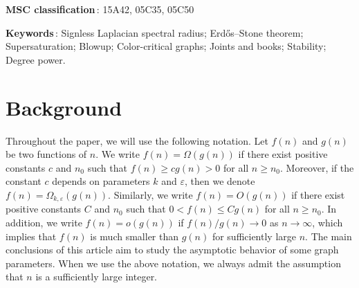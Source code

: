 \documentclass[11pt,a4paper]{article}
\theoremstyle{plain}
\theoremstyle{definition}
\begin{document}
\begin{abstract}
\begin{itemize}
    \item 
    We prove the corresponding stability result for the signless Laplacian spectral radius: Let $F$ be a graph with chromatic number $\chi (F)=k+1\ge 4$. For every $\varepsilon >0$, 
    there exist $n_0$ and $\sigma >0$ such that if $G$ is an $F$-free graph on $n\ge n_0$ vertices with $q(G)\ge (1- \frac{1}{k} - \sigma)2n$, then $G$ can be obtained from $T_{n,k}$ by adding and deleting at most $\varepsilon n^2$ edges.  
\end{itemize} 
Using the probabilistic method, 
we show that the above bounds are optimal up to a constant factor. As applications, we first prove that if $k\ge 2$ and $G$ is an $n$-vertex graph with $m$ edges such that $\sum_{v\in V(G)}d^2(v) \ge 2(1- \frac{1}{k}+ \varepsilon )mn$, then $G$ contains a blowup $K_{k+1}[t]$ with $t=\Omega_{k,\varepsilon}(\log n)$. This generalizes the aforementioned Bollob\'{a}s--Erd\H{o}s theorem. 
{Secondly, we establish the spectral extremal results for hypergraphs by showing that for any graph $F$ with $\chi (F)=k+1$, where $k\ge r\ge 2$, and for any $\varepsilon >0$, there exists $n_0$ such that if $H$ is a linear $r$-uniform hypergraph on $n\ge n_0$ vertices with $q(H)\ge (1- \frac{1}{k} + \varepsilon )\frac{2n}{r-1}$, then $H$ contains an $r$-expansion of $F$.} 
\end{abstract}

 {\bf MSC classification}\,: 15A42, 05C35, 05C50
 
 {\bf Keywords}\,: 
 Signless Laplacian spectral radius;   
 Erd\H{o}s--Stone theorem; 
 Supersaturation; 
 Blowup; 
 Color-critical graphs; 
 Joints and books; 
 Stability; 
 Degree power. 


\newpage 




\section{Background}

Throughout the paper, we will use the following notation. 
Let $f(n)$ and $g(n)$ be two functions of $n$. 
We write $f(n)=\Omega (g(n))$ if 
there exist positive constants $c$ and $n_0$ such that $ f(n)\ge c g(n) >0$ for all $n \ge n_0$. 
Moreover, if the constant $c$ depends on parameters $k$ and $\varepsilon$, then we denote 
$f(n)=\Omega_{k,\varepsilon}(g(n))$. 
Similarly, we write $f(n)=O(g(n))$ if there exist positive constants $C$ and $n_0$ such that $0< f(n)\le Cg(n)$ for all $n\ge n_0$. 
In addition, we write $f(n)=o(g(n))$ if $ f(n)/g(n) \to 0$ as $n\to \infty$, which implies that $f(n)$ is much smaller than $g(n)$ for sufficiently large $n$. 
 The main conclusions of this article aim to study the asymptotic behavior of some graph parameters. 
When we use the above notation, we always admit the assumption that $n$ is a sufficiently large integer. 
\end{document}
